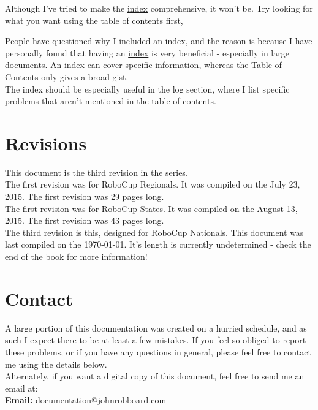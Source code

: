         Although I've tried to make the \hyperref[index]{index} comprehensive, it won't be. Try looking for what you want using the table of contents first, 
        
        People have questioned why I included an \hyperref[index]{index}, and the reason is because I have personally found that having an \hyperref[index]{index} is very beneficial - especially in large documents. An index can cover specific information, whereas the Table of Contents only gives a broad gist.\\
        
        The index should be especially useful in the log section, where I list specific problems that aren't mentioned in the table of contents.\\

    \section*{Revisions}
        This document is the third revision in the series.\\
        
        The first revision was for RoboCup  Regionals. It was compiled on the July 23, 2015. The first revision was 29 pages long.\\
        
        The first revision was for RoboCup States. It was compiled on the August 13, 2015. The first revision was 43 pages long.\\
        
        The third revision is this, designed for RoboCup Nationals. This document was last compiled on the \today. It's length is currently undetermined - check the end of the book for more information!\\

    \section*{Contact}
    \label{sec:contact}
    \label{contact}
        A large portion of this documentation was created on a hurried schedule, and as such I expect there to be at least a few mistakes. If you feel so obliged to report these problems, or if you have any questions in general, please feel free to contact me using the details below.\\
        
        Alternately, if you want a digital copy of this document, feel free to send me an email at:\\
		\textbf{Email: }\href{mailto:documentation@johnrobboard.com}{documentation@johnrobboard.com}